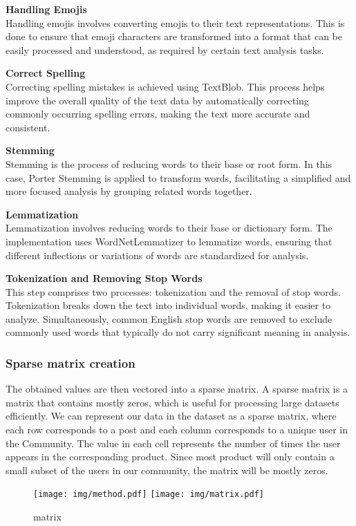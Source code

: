 \noindent\textbf{Handling Emojis}\\
Handling emojis involves converting emojis to their text representations. This is done to ensure that emoji characters are transformed into a format that can be easily processed and understood, as required by certain text analysis tasks.

\noindent\textbf{Correct Spelling}\\
Correcting spelling mistakes is achieved using TextBlob. This process helps improve the overall quality of the text data by automatically correcting commonly occurring spelling errors, making the text more accurate and consistent.

\noindent\textbf{Stemming}\\
Stemming is the process of reducing words to their base or root form. In this case, Porter Stemming is applied to transform words, facilitating a simplified and more focused analysis by grouping related words together.

\noindent\textbf{Lemmatization}\\
Lemmatization involves reducing words to their base or dictionary form. The implementation uses WordNetLemmatizer to lemmatize words, ensuring that different inflections or variations of words are standardized for analysis.

\noindent\textbf{Tokenization and Removing Stop Words}\\
This step comprises two processes: tokenization and the removal of stop words. Tokenization breaks down the text into individual words, making it easier to analyze. Simultaneously, common English stop words are removed to exclude commonly used words that typically do not carry significant meaning in analysis.

\newpage
\subsubsection{Sparse matrix creation}
The obtained values are then vectored into a sparse matrix. A sparse matrix is a matrix that contains mostly zeros, which is useful for processing large datasets efficiently. We can represent our data in the dataset as a sparse matrix, where each row corresponds to a post and each column corresponds to a unique user in the Community. The value in each cell represents the number of times the user appears in the corresponding product. Since most product will only contain a small subset of the users in our community, the matrix will be mostly zeros.
\vspace{1cm}
\begin{figure}[ht]
  \centering
  \texttt{[image: img/method.pdf]}
\centering
\texttt{[image: img/matrix.pdf]}
  \caption{matrix}
  \label{fig:matrix}
\end{figure}
\newpage
